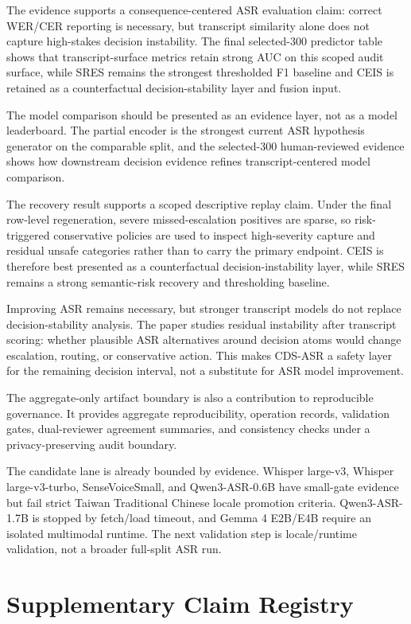 \documentclass[
]{article}
\begin{document}
The evidence supports a consequence-centered ASR evaluation claim:
correct WER/CER reporting is necessary, but transcript similarity alone
does not capture high-stakes decision instability. The final
selected-300 predictor table shows that transcript-surface metrics
retain strong AUC on this scoped audit surface, while SRES remains the
strongest thresholded F1 baseline and CEIS is retained as a
counterfactual decision-stability layer and fusion input.

The model comparison should be presented as an evidence layer, not as a
model leaderboard. The partial encoder is the strongest current ASR
hypothesis generator on the comparable split, and the selected-300
human-reviewed evidence shows how downstream decision evidence refines
transcript-centered model comparison.

The recovery result supports a scoped descriptive replay claim. Under
the final row-level regeneration, severe missed-escalation positives are
sparse, so risk-triggered conservative policies are used to inspect
high-severity capture and residual unsafe categories rather than to
carry the primary endpoint. CEIS is therefore best presented as a
counterfactual decision-instability layer, while SRES remains a strong
semantic-risk recovery and thresholding baseline.

Improving ASR remains necessary, but stronger transcript models do not
replace decision-stability analysis. The paper studies residual
instability after transcript scoring: whether plausible ASR alternatives
around decision atoms would change escalation, routing, or conservative
action. This makes CDS-ASR a safety layer for the remaining decision
interval, not a substitute for ASR model improvement.

The aggregate-only artifact boundary is also a contribution to
reproducible governance. It provides aggregate reproducibility,
operation records, validation gates, dual-reviewer agreement summaries,
and consistency checks under a privacy-preserving audit boundary.

The candidate lane is already bounded by evidence. Whisper large-v3,
Whisper large-v3-turbo, SenseVoiceSmall, and Qwen3-ASR-0.6B have
small-gate evidence but fail strict Taiwan Traditional Chinese locale
promotion criteria. Qwen3-ASR-1.7B is stopped by fetch/load timeout, and
Gemma 4 E2B/E4B require an isolated multimodal runtime. The next
validation step is locale/runtime validation, not a broader full-split
ASR run.

\hypertarget{claim-registry}{%
\section{Supplementary Claim Registry}\label{claim-registry}}
\end{document}
